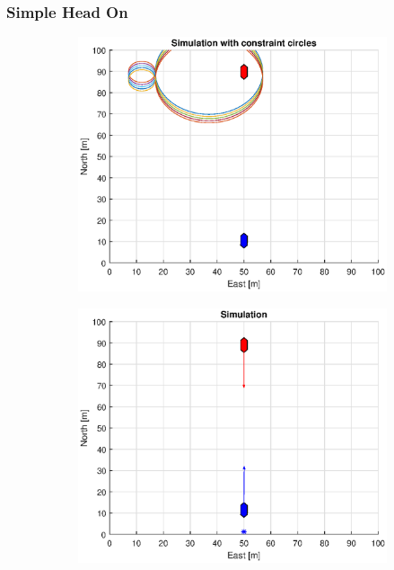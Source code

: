 \subsubsection{Simple Head On}
\begin{figure}[!b] %
    \begin{subfigure}[b]{0.49\textwidth}
        \centering
        \includegraphics[width=\textwidth]{Images/Figures/Enkel_HO/Simple0_f1_Frame1}
    \end{subfigure}
    \hfill
    \begin{subfigure}[b]{0.499\textwidth}
        \centering
        \includegraphics[width=\textwidth]{Images/Figures/Enkel_HO/Simple0_f600_Frame1}

\end{subfigure}
\end{figure}
